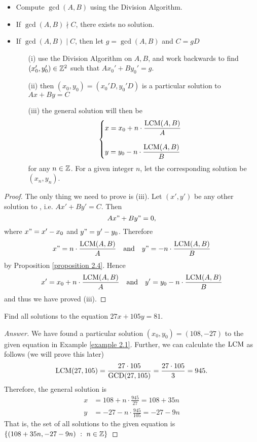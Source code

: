 \begin{theorem}\label{ldea}\hfill
\begin{itemize}
\item Compute $\gcd(A,B)$ using the Division Algorithm.
\item If $\gcd(A,B)\nmid C$, there exists no solution.
\item If $\gcd(A,B) \mid C$, then let $g = \gcd(A,B)$ and $C = gD$
\begin{itemize}
\item[(i)] use the Division Algorithm on $A,B$, and work backwards to find $(x_0',y_0') \in \mathbb Z^2$ such that $Ax_0' + By_0' = g$.
\item[(ii)] then $(x_0,y_0) = (x_0'D,y_0'D)$ is a particular solution to $Ax + By = C$
\item[(iii)] the general solution will then be 
\[\begin{cases}x = x_0 + n\cdot\dfrac{\operatorname{LCM}(A,B)}{A}\\[1.5em] y = y_0 - n\cdot\dfrac{\operatorname{LCM}(A,B)}{B}\end{cases}\]
for any $n \in \mathbb Z$. For a given integer $n$, let the corresponding solution be $(x_n,y_n)$.
\end{itemize}
\end{itemize}
\end{theorem}
\begin{proof}
The only thing we need to prove is (iii). Let $(x',y')$ be any other solution to , i.e. $Ax' + By' = C$. Then
\[Ax" + By" = 0,\]
where $x" = x' - x_0$ and $y" = y' - y_0$. Therefore
\[x" = n\cdot\frac{\operatorname{LCM}(A,B)}{A}\quad\text{and}\quad y" = -n\cdot\frac{\operatorname{LCM}(A,B)}{B}\]
by Proposition \ref{proposition 2.4}. Hence
\[x' = x_0 + n\cdot\dfrac{\operatorname{LCM}(A,B)}{A} \quad\text{and}\quad y' = y_0 - n\cdot\dfrac{\operatorname{LCM}(A,B)}{B}\]
and thus we have proved (iii).
\end{proof}

\vspace*{1em}

\begin{example}
Find all solutions to the equation $27x + 105y = 81$.
\end{example}
\begin{proof}[Answer]
We have found a particular solution $(x_0,y_0) = (108,-27)$ to the given equation in Example \ref{example 2.1}. Further, we can calculate the $\operatorname{LCM}$ as follows (we will prove this later)
\[\operatorname{LCM}(27,105) = \frac{27\cdot 105}{\operatorname{GCD}(27,105)} = \frac{27\cdot 105}{3} = 945.\]
Therefore, the general solution is
\begin{align*}
x &= 108 + n\cdot \frac{945}{27} = 108 + 35n\\[0.5em]
y &= -27 - n\cdot \frac{945}{105} = -27 - 9n
\end{align*}
That is, the set of all solutions to the given equation is $\left\{(108 + 35n,-27 - 9n)\ :\ n \in \mathbb Z\right\}$
\end{proof}

